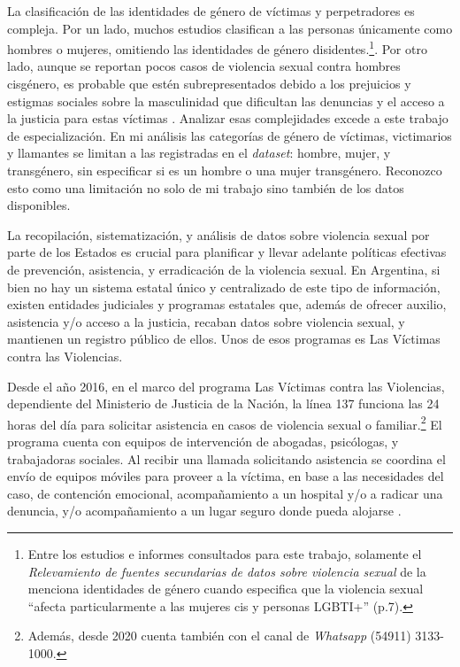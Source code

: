 \documentclass[10 pt]{article}
\begin{document}
La clasificación de las identidades de género de víctimas y perpetradores es compleja. Por un lado, muchos estudios clasifican a las personas únicamente como hombres o mujeres, omitiendo las identidades de género disidentes.\footnote{Entre los estudios e informes consultados para este trabajo, solamente el \textit{Relevamiento de fuentes secundarias de datos sobre violencia sexual} de la \citet{ufem_relevamiento} menciona identidades de género cuando especifica que la violencia sexual “afecta particularmente a las mujeres cis y personas LGBTI+” (p.7).}. Por otro lado, aunque se reportan pocos casos de violencia sexual contra hombres cisgénero, es probable que estén subrepresentados debido a los prejuicios y estigmas sociales sobre la masculinidad que dificultan las denuncias y el acceso a la justicia para estas víctimas \citep*[p.~149]{ferris2002world}. Analizar esas complejidades excede a este trabajo de especialización. En mi análisis las categorías de género de víctimas, victimarios y llamantes se limitan a las registradas en el \textit{dataset}: hombre, mujer, y transgénero, sin especificar si es un hombre o una mujer transgénero. Reconozco esto como una limitación no solo de mi trabajo sino también de los datos disponibles.  

La  recopilación, sistematización, y análisis de datos sobre violencia sexual por parte de los Estados es crucial para planificar y llevar adelante políticas efectivas de prevención, asistencia, y erradicación de la violencia sexual. En Argentina, si bien no hay un sistema estatal único y centralizado de este tipo de información, existen entidades judiciales y programas estatales que, además de ofrecer auxilio, asistencia y/o acceso a la justicia, recaban datos sobre violencia sexual, y mantienen un registro público de ellos. Unos de esos programas es Las Víctimas contra las Violencias. 

Desde el año 2016, en el marco del programa Las Víctimas contra las Violencias, dependiente del Ministerio de Justicia de la Nación, la línea 137 funciona las 24 horas del día para solicitar asistencia en casos de violencia sexual o familiar.\footnote{Además, desde 2020 cuenta también con el canal de \textit{Whatsapp} (54911) 3133-1000.} El programa cuenta con equipos de intervención de abogadas, psicólogas, y trabajadoras sociales. Al recibir una llamada solicitando asistencia se coordina el envío de equipos móviles para proveer a la víctima, en base a las necesidades del caso, de contención emocional, acompañamiento a un hospital y/o a radicar una denuncia, y/o acompañamiento a un lugar seguro donde pueda alojarse \citep*{linea_137}.
\end{document}
